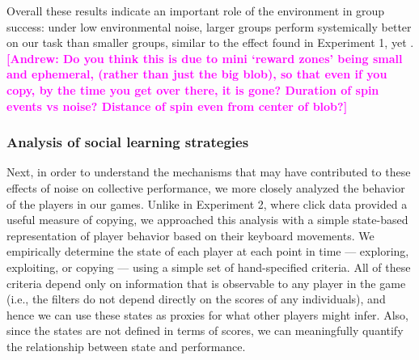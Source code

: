 \documentclass[12pt,letterpaper]{article}
\newcommand{\andrew}[1]{\textcolor{magenta}{\bf [Andrew: #1]}}
\begin{document}
Overall these results indicate an important role of the environment in group success: under low environmental noise, larger groups perform systemically better on our task than smaller groups, similar to the effect found in Experiment 1, yet .
\andrew{Do you think this is due to mini `reward zones' being small and ephemeral, (rather than just the big blob), so that even if you copy, by the time you get over there, it is gone? Duration of spin events vs noise? Distance of spin even from center of blob?}

\subsubsection{Analysis of social learning strategies}

Next, in order to understand the mechanisms that may have contributed to these effects of noise on collective performance, we more closely analyzed the behavior of the players in our games.
Unlike in Experiment 2, where click data provided a useful measure of copying, we approached this analysis with a simple state-based representation of player behavior based on their keyboard movements.
We empirically determine the state of each player at each point in time --- exploring, exploiting, or copying --- using a simple set of hand-specified criteria.
All of these criteria depend only on information that is observable to any player in the game (i.e., the filters do not depend directly on the scores of any individuals), and hence we can use these states as proxies for what other players might infer.
Also, since the states are not defined in terms of scores, we can meaningfully quantify the relationship between state and performance.
\end{document}
